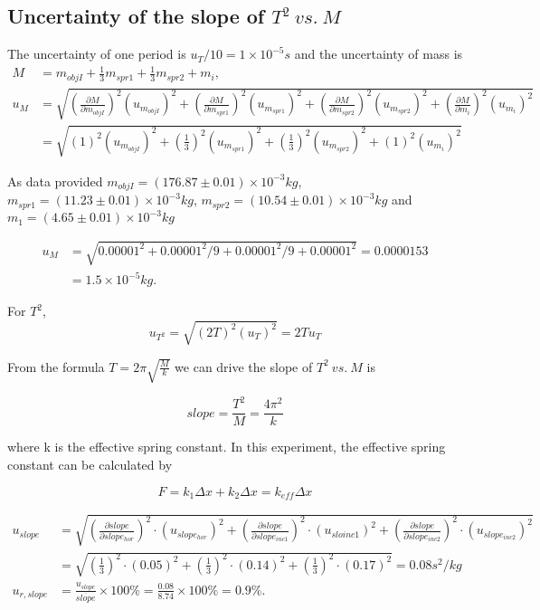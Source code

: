 \subsection{Uncertainty of the slope of $T^2\ vs.\ M$}
The uncertainty of one period is $u_T/10=1\times10^{-5}s$ and the uncertainty of mass is
\[
\begin{split}
    M&=m_{objI}+\frac{1}{3}m_{spr1}+\frac{1}{3}m_{spr2}+m_i,\\
    u_M&=\sqrt{
     (\frac{\partial M}{\partial m_{objI}})^2(u_{m_{objI}})^2
    +(\frac{\partial M}{\partial m_{spr1}})^2(u_{m_{spr1}})^2
    +(\frac{\partial M}{\partial m_{spr2}})^2(u_{m_{spr2}})^2
    +(\frac{\partial M}{\partial m_i})^2(u_{m_i})^2
    }\\
    &=\sqrt{
     (1)^2(u_{m_{objI}})^2
    +(\frac{1}{3})^2(u_{m_{spr1}})^2
    +(\frac{1}{3})^2(u_{m_{spr2}})^2
    +(1)^2(u_{m_i})^2
    }
\end{split}
\]

As data provided 
$m_{objI}=(176.87\pm0.01)\times10^{-3}kg$, $m_{spr1}=(11.23\pm0.01)\times10^{-3}kg$, $m_{spr2}=(10.54\pm0.01)\times10^{-3}kg$ and $m_1=(4.65\pm0.01)\times10^{-3}kg$

\[
\begin{split}
    u_M & = \sqrt{0.00001^2+0.00001^2/9+0.00001^2/9+0.00001^2}=0.0000153\\
        & = 1.5\times10^{-5}kg.
\end{split}
\]

For $T^2$,
$$   u_{T^2}=\sqrt{(2T)^2(u_T)^2}=2Tu_T$$

From the formula $T=2\pi\sqrt{\frac{M}{k}}$ 
we can drive the slope of $T^2\ vs.\ M$ is

$$	slope=\frac{T^2}{M}=\frac{4\pi^2}{k}$$

where k is the effective spring constant. In this experiment, the effective spring constant can be calculated by

$$  F =k_1\Delta x+k_2\Delta x  =k_{eff}\Delta x   $$


\[
\begin{split}
u_{slope} & = \sqrt{
	(\frac{\partial slope}{\partial slope_{hor}})^2\cdot(u_{slope_{hor}})^2
	+(\frac{\partial slope}{\partial slope_{inc1}})^2\cdot(u_{sloinc1})^2
	+(\frac{\partial slope}{\partial slope_{inc2}})^2\cdot(u_{slope_{inc2}})^2} \\
& = \sqrt{
	(\frac{1}{3})^2\cdot(0.05)^2
	+(\frac{1}{3})^2\cdot(0.14)^2
	+(\frac{1}{3})^2\cdot(0.17)^2} = 0.08s^2/kg\\
u_{r,slope} & = \frac{u_{slope}}{\overline{slope}}\times100\%
              =\frac{0.08}{8.74}\times100\%=0.9\%.
\end{split}
\]

